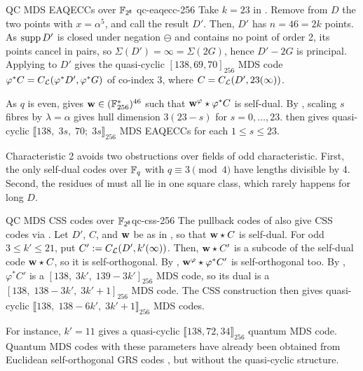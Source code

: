 \documentclass[twocolumn, 11pt]{scrartcl}
\begin{document}
\begin{example}{QC MDS EAQECCs over $\mathsf{\mathbb{F}_{2^8}}$ \cite{code-f256}}{qc-eaqecc-256}
Take $k=23$ in . Remove from $D$ the two points with $x=\alpha^5$, and call the result $D'$. Then, $D'$ has $n=46=2k$ points. As $\operatorname{supp} D'$ is closed under negation $\ominus$ and contains no point of order 2, its points cancel in pairs, so $\Sigma(D')=\infty=\Sigma(2G)$, hence $D'-2G$ is principal. Applying  to $D'$ gives the quasi-cyclic $[138,69,70]_{256}$ MDS code $\varphi^*C=C_\mathcal{L}(\varphi^*D',\varphi^*G)$ of co-index 3, where $C=C_\mathcal{L}(D',23(\infty))$.
 
As $q$ is even,  gives $\mathbf{w}\in(\mathbb{F}_{256}^*)^{46}$ such that $\mathbf{w}^\varphi\star\varphi^*C$ is self-dual. By , scaling $s$ fibres by $\lambda=\alpha$ gives hull dimension $3(23-s)$ for $s=0,\hdots,23$.  then gives quasi-cyclic $\llbracket138,\;3s,\;70;\;3s\rrbracket_{256}$ MDS EAQECCs for each $1\leq s\leq 23$.

Characteristic 2 avoids two obstructions over fields of odd characteristic. First, the only self-dual codes over $\mathbb{F}_q$ with $q\equiv3\pmod4$ have lengths divisible by 4. Second, the residues of  must all lie in one square class, which rarely happens for long $D$.
\end{example}

\begin{example}{QC MDS CSS codes over $\mathsf{\mathbb{F}_{2^8}}$}{qc-css-256} 
The pullback codes of  also give CSS codes via . Let $D'$, $C$, and $\mathbf{w}$ be as in , so that $\mathbf{w}\star C$ is self-dual. For odd $3\leq k'\leq21$, put $C':=C_\mathcal{L}(D',k'(\infty))$. Then, $\mathbf{w}\star C'$ is a subcode of the self-dual code $\mathbf{w}\star C$, so it is self-orthogonal. By , $\mathbf{w}^\varphi\star\varphi^*C'$ is self-orthogonal too. By , $\varphi^*C'$ is a $[138,\;3k',\;139-3k']_{256}$ MDS code, so its dual is a $[138,\;138-3k',\;3k'+1]_{256}$ MDS code. The CSS construction then gives quasi-cyclic $\llbracket138,\;138-6k',\;3k'+1\rrbracket_{256}$ MDS codes.

For instance, $k'=11$ gives a quasi-cyclic $\llbracket138,72,34\rrbracket_{256}$ quantum MDS code. Quantum MDS codes with these parameters have already been obtained from Euclidean self-orthogonal GRS codes \cite[Thm.~5.3]{jin2012euclidean}, but without the quasi-cyclic structure.
\end{example}
\end{document}
